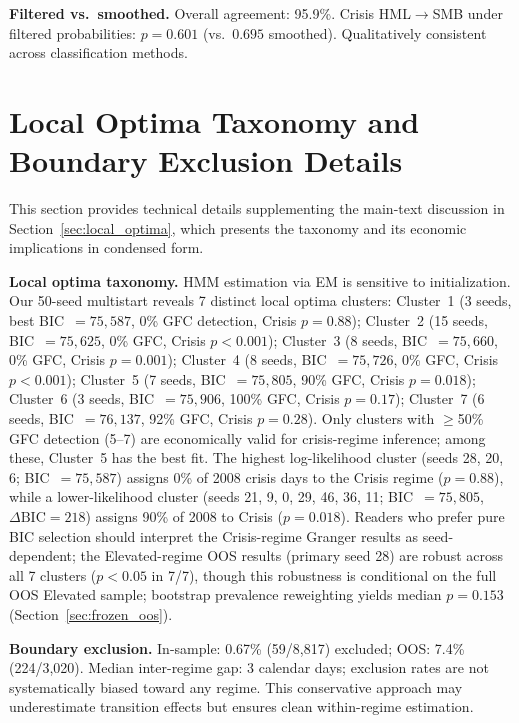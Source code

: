 \documentclass[sigconf,anonymous]{acmart}
\begin{document}
\textbf{Filtered vs.\ smoothed.} Overall agreement: 95.9\%.
Crisis HML$\to$SMB under filtered probabilities: $p = 0.601$ (vs.\ $0.695$ smoothed).
Qualitatively consistent across classification methods.

\section{Local Optima Taxonomy and Boundary Exclusion Details}
\label{app:optima}

This section provides technical details supplementing the main-text discussion in Section~\ref{sec:local_optima},
which presents the taxonomy and its economic implications in condensed form.

\textbf{Local optima taxonomy.}
HMM estimation via EM is sensitive to initialization. Our 50-seed multistart
reveals 7 distinct local optima clusters:
Cluster~1 (3 seeds, best BIC~$= 75{,}587$, 0\% GFC detection, Crisis $p = 0.88$);
Cluster~2 (15 seeds, BIC~$= 75{,}625$, 0\% GFC, Crisis $p < 0.001$);
Cluster~3 (8 seeds, BIC~$= 75{,}660$, 0\% GFC, Crisis $p = 0.001$);
Cluster~4 (8 seeds, BIC~$= 75{,}726$, 0\% GFC, Crisis $p < 0.001$);
Cluster~5 (7 seeds, BIC~$= 75{,}805$, 90\% GFC, Crisis $p = 0.018$);
Cluster~6 (3 seeds, BIC~$= 75{,}906$, 100\% GFC, Crisis $p = 0.17$);
Cluster~7 (6 seeds, BIC~$= 76{,}137$, 92\% GFC, Crisis $p = 0.28$).
Only clusters with $\geq$50\% GFC detection (5--7) are economically valid for
crisis-regime inference; among these, Cluster~5 has the best fit.
The highest log-likelihood cluster (seeds 28, 20, 6; BIC~$= 75{,}587$)
assigns 0\% of 2008 crisis days to the Crisis regime ($p = 0.88$),
while a lower-likelihood cluster (seeds 21, 9, 0, 29, 46, 36, 11;
BIC~$= 75{,}805$, $\Delta\text{BIC} = 218$) assigns 90\% of 2008 to Crisis
($p = 0.018$). Readers who prefer pure BIC selection should interpret the
Crisis-regime Granger results as seed-dependent; the Elevated-regime OOS results
(primary seed 28) are robust across all 7 clusters ($p < 0.05$ in 7/7),
though this robustness is conditional on the full OOS Elevated sample;
bootstrap prevalence reweighting yields median $p = 0.153$
(Section~\ref{sec:frozen_oos}).

\textbf{Boundary exclusion.}
In-sample: 0.67\% (59/8{,}817) excluded; OOS: 7.4\% (224/3{,}020).
Median inter-regime gap: 3 calendar days; exclusion rates are not
systematically biased toward any regime. This conservative approach
may underestimate transition effects but ensures clean within-regime estimation.


\end{document}

